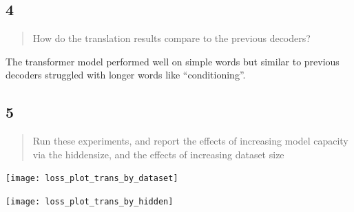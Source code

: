 \documentclass{article}
\begin{document}
\subsection*{4}

\begin{quote}
How do the translation results compare to the previous decoders?
\end{quote}

The transformer model performed well on simple words but similar to previous decoders struggled with longer words like ``conditioning''.

\subsection*{5}

\begin{quote}
Run these experiments,  and report the effects of increasing model capacity via the hiddensize, and the effects of increasing dataset size
\end{quote}

\texttt{[image: loss\_plot\_trans\_by\_dataset]}

\texttt{[image: loss\_plot\_trans\_by\_hidden]}
\end{document}
